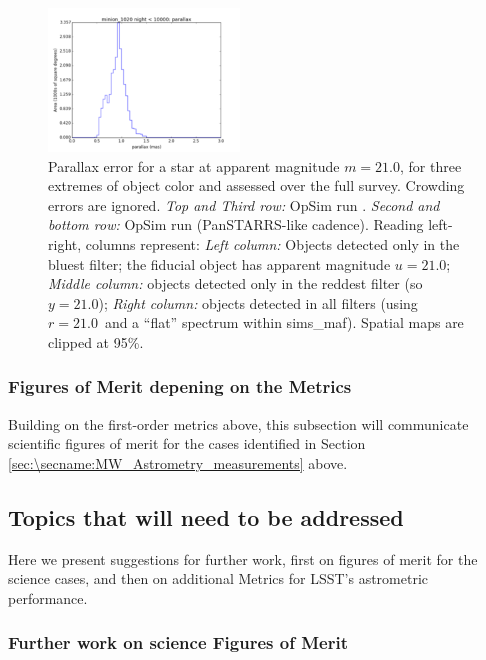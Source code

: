 \begin{figure}[ht]
\begin{center}
  \includegraphics[width=2.0in]{./figs/milkyway/astromPanels/MW_Astrom_paError_PanSTARRS_10y_hst.png}
  \end{center}
  \caption{Parallax error for a star at apparent magnitude $m=21.0$, for three extremes of object color and assessed over the full survey. Crowding errors are ignored. {\it Top and Third row:} OpSim run . {\it Second and bottom row:} OpSim run  (PanSTARRS-like cadence). Reading left-right, columns represent: {\it Left column:} Objects detected only in the bluest filter; the fiducial object has apparent magnitude $u=21.0$; {\it Middle column:} objects detected only in the reddest filter (so $y = 21.0$); {\it Right column:} objects detected in all filters (using $r=21.0$~and a ``flat'' spectrum within sims\_maf). Spatial maps are clipped at 95\%.}
  \label{fig_astrom_ByFilter_paError}
\end{figure}

\subsubsection{Figures of Merit depening on the Metrics}

Building on the first-order metrics above, this subsection will communicate scientific figures of merit for the cases identified in Section \ref{sec:\secname:MW_Astrometry_measurements} above.


\subsection{Topics that will need to be addressed}
\label{sec:\secname:MW_Astrometry_furtherwork}

Here we present suggestions for further work, first on figures of
merit for the science cases, and then on additional Metrics for LSST's
astrometric performance.

\subsubsection{Further work on science Figures of Merit}

